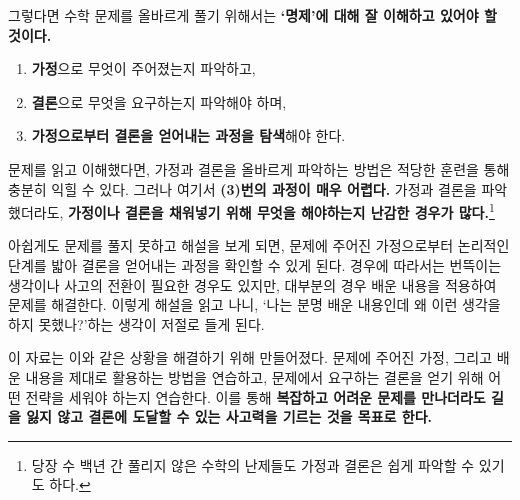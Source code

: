 \pagebreak

그렇다면 수학 문제를 올바르게 풀기 위해서는 \textbf{`명제'에 대해 잘 이해하고 있어야 할 것이다.}

\begin{enumerate}
    \item \textbf{가정}으로 무엇이 주어졌는지 파악하고,
    \item \textbf{결론}으로 무엇을 요구하는지 파악해야 하며,
    \item \textbf{가정으로부터 결론을 얻어내는 과정을 탐색}해야 한다.
\end{enumerate}

문제를 읽고 이해했다면, 가정과 결론을 올바르게 파악하는 방법은 적당한 훈련을 통해 충분히 익힐 수 있다. 그러나 여기서 \textbf{(3)번의 과정이 매우 어렵다.} 가정과 결론을 파악했더라도, \textbf{가정이나 결론을 채워넣기 위해 무엇을 해야하는지 난감한 경우가 많다.}\footnote{당장 수 백년 간 풀리지 않은 수학의 난제들도 가정과 결론은 쉽게 파악할 수 있기도 하다.}

아쉽게도 문제를 풀지 못하고 해설을 보게 되면, 문제에 주어진 가정으로부터 논리적인 단계를 밟아 결론을 얻어내는 과정을 확인할 수 있게 된다. 경우에 따라서는 번뜩이는 생각이나 사고의 전환이 필요한 경우도 있지만, 대부분의 경우 배운 내용을 적용하여 문제를 해결한다. 이렇게 해설을 읽고 나니, `나는 분명 배운 내용인데 왜 이런 생각을 하지 못했나?'하는 생각이 저절로 들게 된다.

이 자료는 이와 같은 상황을 해결하기 위해 만들어졌다. 문제에 주어진 가정, 그리고 배운 내용을 제대로 활용하는 방법을 연습하고, 문제에서 요구하는 결론을 얻기 위해 어떤 전략을 세워야 하는지 연습한다. 이를 통해 \textbf{복잡하고 어려운 문제를 만나더라도 길을 잃지 않고 결론에 도달할 수 있는 사고력을 기르는 것을 목표로 한다.}

\pagebreak
